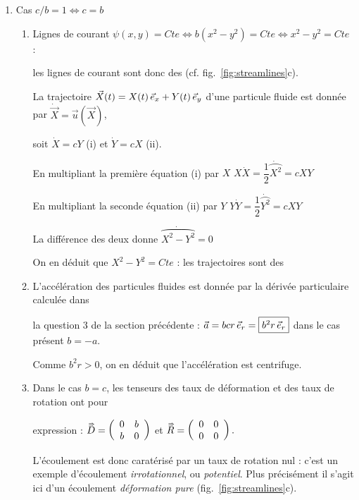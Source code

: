 \documentclass[10pt, a4paper]{article}
\renewcommand{\myvec}[1]{\vec{#1}}
\begin{document}
\begin{enumerate}
\bigskip
\item
Cas $c/b=1 \Leftrightarrow c=b$
\medskip
\begin{enumerate}

\item
Lignes de courant $\psi(x, y) = Cte \Leftrightarrow b(x^2-y^2) = Cte \Leftrightarrow x^2-y^2=Cte$ : 

\medskip
les lignes de courant sont donc des
 (cf. fig.~\ref{fig:streamlines}c).

\medskip
La trajectoire $\myvec{X}(t) = X(t) \, \ex + Y(t) \, \ey$ d'une particule fluide est donnée par
$\dot{\myvec{X}} = \myvec{u}(\myvec{X})$, 

\medskip
soit $\dot{X} = c Y$ (i) et $\dot{Y} = c X$ (ii).

En multipliant la première équation (i) par $X$ \dotfill $X\dot{X} = \dfrac{1}{2} \dot{\wideparen{X^2}} = c XY$

En multipliant la seconde équation (ii) par $Y$ \dotfill $Y\dot{Y} = \dfrac{1}{2} \dot{\wideparen{Y^2}} = c XY$

La différence des deux donne \dotfill $\dot{\wideparen{X^2-Y^2}} = 0$

\medskip
On en déduit que $X^2-Y^2 = Cte$ : les trajectoires sont des 

\medskip
\item
L'accélération des particules fluides est donnée par la dérivée particulaire calculée dans 

\medskip
la question 3 
de la section précédente :
$\myvec{a} = bc r\, \er = \fbox{$b^2 r\, \er  $}$ dans le cas présent $b=-a$.

\medskip
Comme $b^2r > 0$, on en déduit que l'accélération est centrifuge.

\medskip
\item
Dans le cas $b=c$, les tenseurs des taux de déformation et des taux de rotation ont pour 

\medskip
expression :
$\accentset{\Rightarrow}{D} = 	 \left (
		\begin{array}{cc}
			0 & b \\ 
		b & 0 
		\end{array}
	\right )$
et
$\accentset{\Rightarrow}{R} = 	 \left (
		\begin{array}{cc}
			0 & 0 \\ 
		0 & 0 
		\end{array}
	\right ).
$

\medskip
L'écoulement est donc caratérisé par un taux de rotation nul :  c'est un exemple d'écoulement \textsl{irrotationnel},
ou \textsl{potentiel}.
Plus précisément il s'agit ici d'un écoulement  \textsl{déformation pure} (fig.~\ref{fig:streamlines}c).

\end{enumerate}
\end{enumerate}
\end{document}
